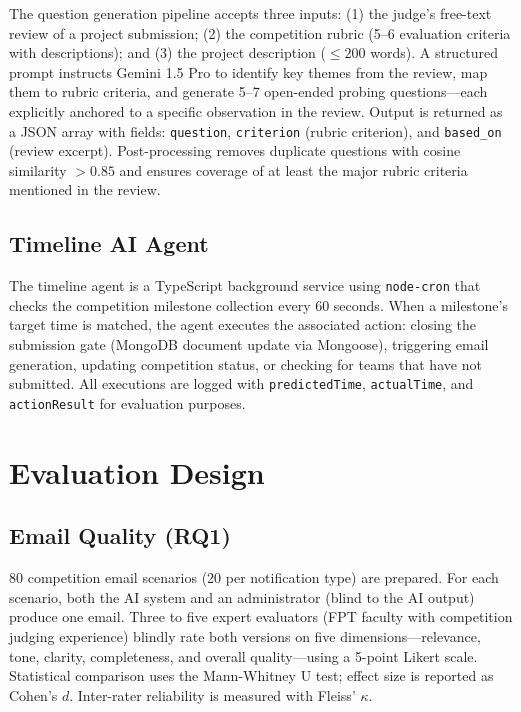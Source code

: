 \documentclass[runningheads]{llncs}
\begin{document}
The question generation pipeline accepts three inputs: (1) the judge's free-text review of a project submission; (2) the competition rubric (5--6 evaluation criteria with descriptions); and (3) the project description ($\leq 200$ words). A structured prompt instructs Gemini 1.5 Pro to identify key themes from the review, map them to rubric criteria, and generate 5--7 open-ended probing questions---each explicitly anchored to a specific observation in the review. Output is returned as a JSON array with fields: \texttt{question}, \texttt{criterion} (rubric criterion), and \texttt{based\_on} (review excerpt). Post-processing removes duplicate questions with cosine similarity $> 0.85$ and ensures coverage of at least the major rubric criteria mentioned in the review.

\subsection{Timeline AI Agent}

The timeline agent is a TypeScript background service using \texttt{node-cron} that checks the competition milestone collection every 60 seconds. When a milestone's target time is matched, the agent executes the associated action: closing the submission gate (MongoDB document update via Mongoose), triggering email generation, updating competition status, or checking for teams that have not submitted. All executions are logged with \texttt{predictedTime}, \texttt{actualTime}, and \texttt{actionResult} for evaluation purposes.

\section{Evaluation Design}

\subsection{Email Quality (RQ1)}

80 competition email scenarios (20 per notification type) are prepared. For each scenario, both the AI system and an administrator (blind to the AI output) produce one email. Three to five expert evaluators (FPT faculty with competition judging experience) blindly rate both versions on five dimensions---relevance, tone, clarity, completeness, and overall quality---using a 5-point Likert scale. Statistical comparison uses the Mann-Whitney U test; effect size is reported as Cohen's $d$. Inter-rater reliability is measured with Fleiss' $\kappa$.
\end{document}
